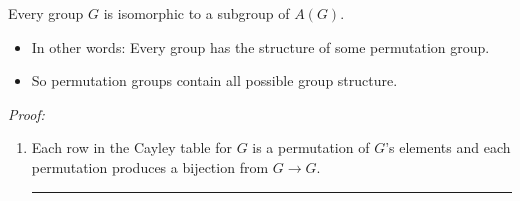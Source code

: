 \begin{theorem}
Every group $G$ is isomorphic to a subgroup of $A(G)$.
\begin{itemize}
    \item In other words: Every group has the structure of some permutation group.
    \item So permutation groups contain all possible group structure.
\end{itemize}
\textit{Proof:}
\begin{enumerate}
   \item Each row in the Cayley table for $G$ is a permutation of $G$'s elements and each
   permutation produces a bijection from $G\rightarrow G$.\\%

\noindent \hrule


\end{enumerate}
\end{theorem}
